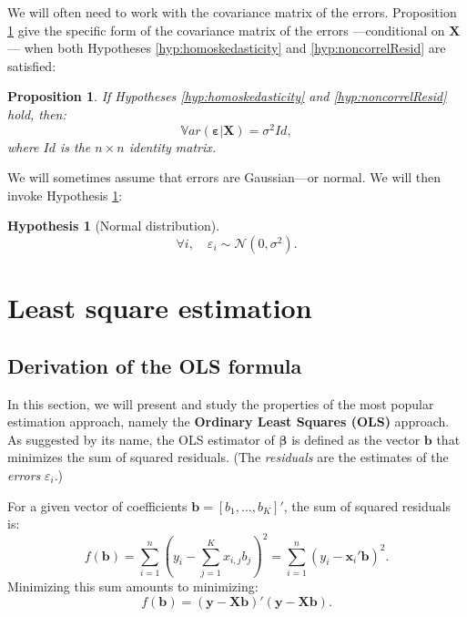 \documentclass[
  12pt,
]{book}
\newtheorem{proposition}{Proposition}[chapter]
\theoremstyle{definition}
\theoremstyle{definition}
\theoremstyle{definition}
\theoremstyle{definition}
\newtheorem{hypothesis}{Hypothesis}[chapter]
\theoremstyle{remark}
\begin{document}
We will often need to work with the covariance matrix of the errors. Proposition \ref{prp:Sigma} give the specific form of the covariance matrix of the errors ---conditional on \(\mathbf{X}\)--- when both Hypotheses \ref{hyp:homoskedasticity} and \ref{hyp:noncorrelResid} are satisfied:

\begin{proposition}
\protect\hypertarget{prp:Sigma}{}\label{prp:Sigma}If Hypotheses \ref{hyp:homoskedasticity} and \ref{hyp:noncorrelResid} hold, then:
\[
\mathbb{V}ar(\boldsymbol\varepsilon|\mathbf{X})= \sigma^2 Id,
\]
where \(Id\) is the \(n \times n\) identity matrix.
\end{proposition}

We will sometimes assume that errors are Gaussian---or normal. We will then invoke Hypothesis \ref{hyp:normality}:

\begin{hypothesis}[Normal distribution]
\protect\hypertarget{hyp:normality}{}\label{hyp:normality}\[
\forall i, \quad \varepsilon_i \sim \mathcal{N}(0,\sigma^2).
\]
\end{hypothesis}

\hypertarget{LSquares}{%
\section{Least square estimation}\label{LSquares}}

\hypertarget{derivation-of-the-ols-formula}{%
\subsection{Derivation of the OLS formula}\label{derivation-of-the-ols-formula}}

In this section, we will present and study the properties of the most popular estimation approach, namely the \textbf{Ordinary Least Squares (OLS)} approach. As suggested by its name, the OLS estimator of \(\boldsymbol\beta\) is defined as the vector \(\mathbf{b}\) that minimizes the sum of squared residuals. (The \emph{residuals} are the estimates of the \emph{errors} \(\varepsilon_i\).)

For a given vector of coefficients \(\mathbf{b}=[b_1,\dots,b_K]'\), the sum of squared residuals is:
\[
f(\mathbf{b}) =\sum_{i=1}^n \left(y_i - \sum_{j=1}^K x_{i,j} b_j \right)^2 = \sum_{i=1}^n (y_i - \mathbf{x}_i' \mathbf{b})^2.
\]
Minimizing this sum amounts to minimizing:
\[
f(\mathbf{b}) = (\mathbf{y} - \mathbf{X}\mathbf{b})'(\mathbf{y} - \mathbf{X}\mathbf{b}).
\]
\end{document}
